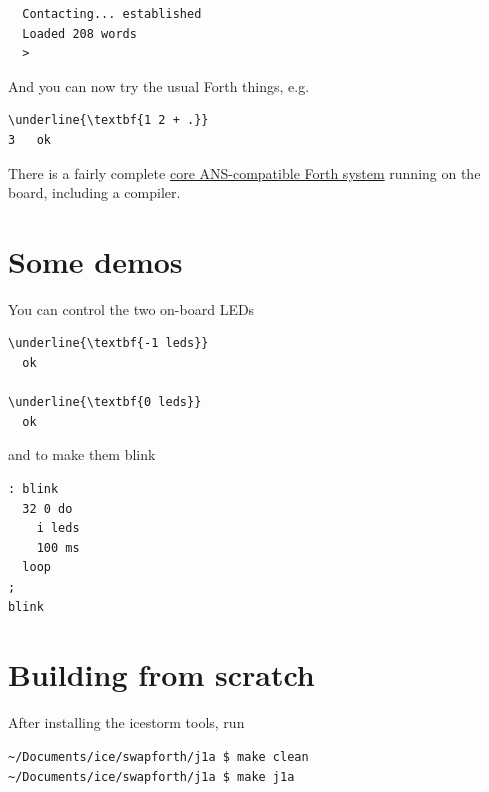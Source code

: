 \begin{framed}
\begin{Verbatim}
  Contacting... established
  Loaded 208 words
  >
\end{Verbatim}
\end{framed}

And you can now try the usual Forth things, e.g.

\begin{framed}
\begin{Verbatim}[commandchars=\\\{\}]
\underline{\textbf{1 2 + .}}
3   ok
\end{Verbatim}
\end{framed}

There is a fairly complete 
\href{http://forth.sourceforge.net/std/dpans/dpans6.htm}{core ANS-compatible Forth system}
running on the board, including a compiler.

\section{Some demos} 

You can control the two on-board LEDs 

\begin{framed}
\begin{Verbatim}[commandchars=\\\{\}]
\underline{\textbf{-1 leds}}
  ok

\underline{\textbf{0 leds}}
  ok
\end{Verbatim}
\end{framed}

\noindent
and to make them blink

\begin{framed}
\begin{Verbatim}[commandchars=\\\{\}]
: blink
  32 0 do
    i leds
    100 ms
  loop
;
blink
\end{Verbatim}
\end{framed}



\section{Building from scratch}

After installing the icestorm tools, run

\begin{Verbatim}
~/Documents/ice/swapforth/j1a $ make clean
~/Documents/ice/swapforth/j1a $ make j1a
\end{Verbatim}

